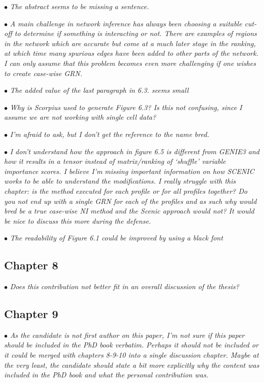 \documentclass[10pt]{article}
\newcommand{\exam}[2][\  ]{\hspace{0pt}\marginpar{\color{red}#1}$\bullet$ \textit{#2}}
\newcommand{\imp}[1]{{\color{red} #1}}
\newcommand{\bigexclaim}{\raisebox{-0.1em}{\BigTriangleUp}\hspace{-0.32em}\llap{\small\textbf{!}}\hspace{0.32em}}
\newcommand{\tagimp}{\bigexclaim}
\begin{document}
{{\exam{The abstract seems to be missing a sentence.}


\exam{\imp{A main challenge in network inference has always been choosing a suitable
		cut-off to determine if something is interacting or not.} There are examples of
		regions in the network which are accurate but come at a much later stage in
		the ranking, at which time many spurious edges have been added to other
		parts of the network. I can only assume that this problem becomes even more
		challenging if one wishes to create case-wise GRN.}
	

\exam{The added value of the last paragraph in 6.3. seems small}

\exam{Why is Scorpius used to generate Figure 6.3? Is this not confusing, since I
		assume we are not working with single cell data?}

\exam{I’m afraid to ask, but I don’t get the reference to the name bred.}
 

\exam{\imp{I don’t understand how the approach in figure 6.5 is different from GENIE3 and
		how it results in a tensor instead of matrix/ranking of ‘shuffle’ variable
		importance scores.} I believe I’m missing important information on how
		SCENIC works to be able to understand the modifications. I really struggle
		with this chapter: is the method executed for each profile or for all profiles
		together? Do you not end up with a single GRN for each of the profiles and as
		such why would bred be a true case-wise NI method and the Scenic approach
		would not? It would be nice to discuss this more during the defense.}


\exam{The readability of Figure 6.1 could be improved by using a black font}
 



\subsection{Chapter 8}
\exam{Does this contribution not better fit in an overall discussion of the thesis?}


\subsection{Chapter 9}
\exam[\tagimp]{\imp{As the candidate is not first author on this paper, I’m not sure if this paper
		should be included in the PhD book verbatim.} Perhaps it should not be
		included or it could be merged with chapters 8-9-10 into a single discussion
		chapter. Maybe at the very least, the candidate should state a bit more
		explicitly why the content was included in the PhD book and what the personal
		contribution was.}

}}
\end{document}
